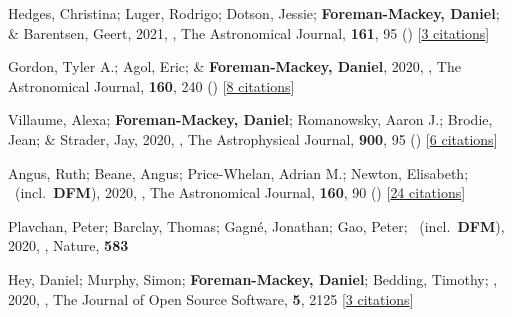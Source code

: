 \item[{\color{numcolor}\scriptsize61}] Hedges, Christina; Luger, Rodrigo; Dotson, Jessie; \textbf{Foreman-Mackey, Daniel}; \& Barentsen, Geert, 2021, , The Astronomical Journal, \textbf{161}, 95 () [\href{https://ui.adsabs.harvard.edu/abs/2021AJ....161...95H}{3 citations}]

\item[{\color{numcolor}\scriptsize60}] Gordon, Tyler A.; Agol, Eric; \& \textbf{Foreman-Mackey, Daniel}, 2020, , The Astronomical Journal, \textbf{160}, 240 () [\href{https://ui.adsabs.harvard.edu/abs/2020AJ....160..240G}{8 citations}]

\item[{\color{numcolor}\scriptsize59}] Villaume, Alexa; \textbf{Foreman-Mackey, Daniel}; Romanowsky, Aaron J.; Brodie, Jean; \& Strader, Jay, 2020, , The Astrophysical Journal, \textbf{900}, 95 () [\href{https://ui.adsabs.harvard.edu/abs/2020ApJ...900...95V}{6 citations}]

\item[{\color{numcolor}\scriptsize58}] Angus, Ruth; Beane, Angus; Price-Whelan, Adrian M.; Newton, Elisabeth; \etal\ (incl.\ \textbf{DFM}), 2020, , The Astronomical Journal, \textbf{160}, 90 () [\href{https://ui.adsabs.harvard.edu/abs/2020AJ....160...90A}{24 citations}]

\item[{\color{numcolor}\scriptsize57}] Plavchan, Peter; Barclay, Thomas; Gagn{\'e}, Jonathan; Gao, Peter; \etal\ (incl.\ \textbf{DFM}), 2020, , Nature, \textbf{583}

\item[{\color{numcolor}\scriptsize56}] Hey, Daniel; Murphy, Simon; \textbf{Foreman-Mackey, Daniel}; Bedding, Timothy; \etal, 2020, , The Journal of Open Source Software, \textbf{5}, 2125 [\href{https://ui.adsabs.harvard.edu/abs/2020JOSS....5.2125H}{3 citations}]

